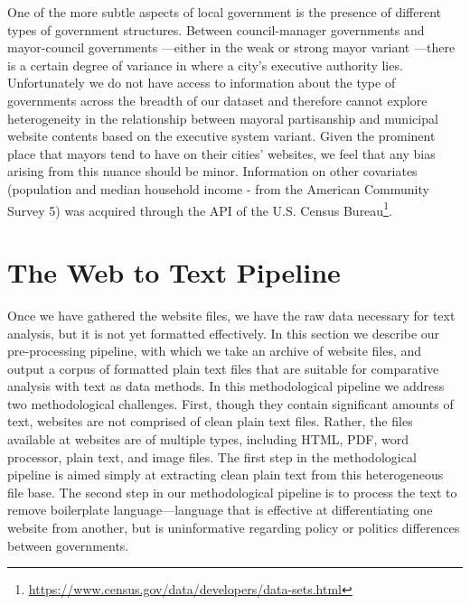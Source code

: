 \documentclass[11pt]{article}
\begin{document}
 



One of the more subtle aspects of local government is the presence of different types of government structures. Between council-manager governments and mayor-council governments \citep{morgan1992policy}---either in the weak or strong mayor variant \citep{desantis2002city}---there is a certain degree of variance in where a city's executive authority lies. Unfortunately we do not have access to information about the type of governments across the breadth of our dataset and therefore cannot explore heterogeneity in the relationship between mayoral partisanship and municipal website contents based on the executive system variant. Given the prominent place that mayors tend to have on their cities' websites, we feel that any bias arising from this nuance should be minor. Information on other covariates (population and median household income - from the American Community Survey 5) was acquired through the API of the U.S. Census Bureau\footnote{\url{https://www.census.gov/data/developers/data-sets.html}}.







\section{The Web to Text Pipeline}

Once we have gathered the website files, we have the raw data necessary for text analysis, but it is not yet formatted effectively. In this section we describe our pre-processing pipeline, with which we take an archive of website files, and output a corpus of formatted plain text files that are suitable for comparative analysis with text as data methods. In this methodological pipeline we address two methodological challenges. First, though they contain significant amounts of text, websites are not comprised of clean plain text files. Rather, the files available at websites are of multiple types, including HTML, PDF, word processor, plain text, and image files. The first step in the methodological pipeline is aimed simply at extracting clean plain text from this heterogeneous file base. The second step in our methodological pipeline is to process the text to remove boilerplate language---language that is effective at differentiating one website from another, but is uninformative regarding policy or politics differences between governments. 
\end{document}
